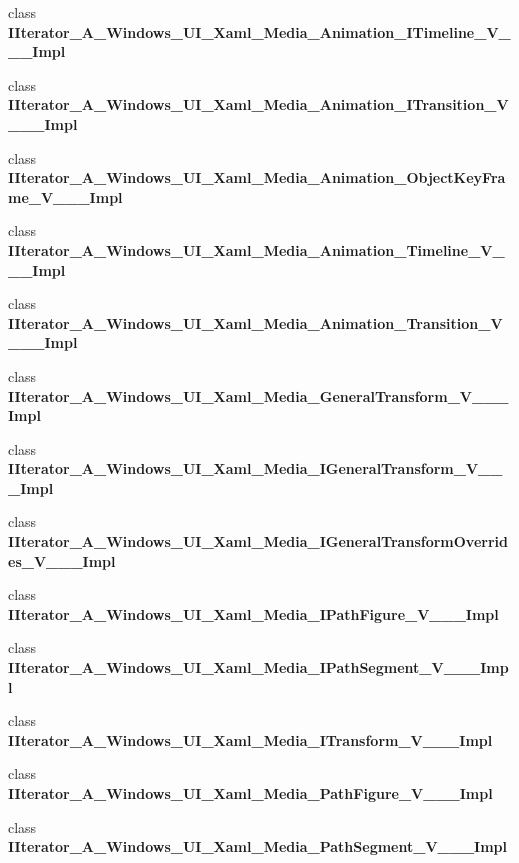 \begin{DoxyCompactItemize}
\item 
class {\bfseries I\+Iterator\+\_\+\+A\+\_\+\+Windows\+\_\+\+U\+I\+\_\+\+Xaml\+\_\+\+Media\+\_\+\+Animation\+\_\+\+I\+Timeline\+\_\+\+V\+\_\+\+\_\+\+\_\+\+Impl}
\item 
class {\bfseries I\+Iterator\+\_\+\+A\+\_\+\+Windows\+\_\+\+U\+I\+\_\+\+Xaml\+\_\+\+Media\+\_\+\+Animation\+\_\+\+I\+Transition\+\_\+\+V\+\_\+\+\_\+\+\_\+\+Impl}
\item 
class {\bfseries I\+Iterator\+\_\+\+A\+\_\+\+Windows\+\_\+\+U\+I\+\_\+\+Xaml\+\_\+\+Media\+\_\+\+Animation\+\_\+\+Object\+Key\+Frame\+\_\+\+V\+\_\+\+\_\+\+\_\+\+Impl}
\item 
class {\bfseries I\+Iterator\+\_\+\+A\+\_\+\+Windows\+\_\+\+U\+I\+\_\+\+Xaml\+\_\+\+Media\+\_\+\+Animation\+\_\+\+Timeline\+\_\+\+V\+\_\+\+\_\+\+\_\+\+Impl}
\item 
class {\bfseries I\+Iterator\+\_\+\+A\+\_\+\+Windows\+\_\+\+U\+I\+\_\+\+Xaml\+\_\+\+Media\+\_\+\+Animation\+\_\+\+Transition\+\_\+\+V\+\_\+\+\_\+\+\_\+\+Impl}
\item 
class {\bfseries I\+Iterator\+\_\+\+A\+\_\+\+Windows\+\_\+\+U\+I\+\_\+\+Xaml\+\_\+\+Media\+\_\+\+General\+Transform\+\_\+\+V\+\_\+\+\_\+\+\_\+\+Impl}
\item 
class {\bfseries I\+Iterator\+\_\+\+A\+\_\+\+Windows\+\_\+\+U\+I\+\_\+\+Xaml\+\_\+\+Media\+\_\+\+I\+General\+Transform\+\_\+\+V\+\_\+\+\_\+\+\_\+\+Impl}
\item 
class {\bfseries I\+Iterator\+\_\+\+A\+\_\+\+Windows\+\_\+\+U\+I\+\_\+\+Xaml\+\_\+\+Media\+\_\+\+I\+General\+Transform\+Overrides\+\_\+\+V\+\_\+\+\_\+\+\_\+\+Impl}
\item 
class {\bfseries I\+Iterator\+\_\+\+A\+\_\+\+Windows\+\_\+\+U\+I\+\_\+\+Xaml\+\_\+\+Media\+\_\+\+I\+Path\+Figure\+\_\+\+V\+\_\+\+\_\+\+\_\+\+Impl}
\item 
class {\bfseries I\+Iterator\+\_\+\+A\+\_\+\+Windows\+\_\+\+U\+I\+\_\+\+Xaml\+\_\+\+Media\+\_\+\+I\+Path\+Segment\+\_\+\+V\+\_\+\+\_\+\+\_\+\+Impl}
\item 
class {\bfseries I\+Iterator\+\_\+\+A\+\_\+\+Windows\+\_\+\+U\+I\+\_\+\+Xaml\+\_\+\+Media\+\_\+\+I\+Transform\+\_\+\+V\+\_\+\+\_\+\+\_\+\+Impl}
\item 
class {\bfseries I\+Iterator\+\_\+\+A\+\_\+\+Windows\+\_\+\+U\+I\+\_\+\+Xaml\+\_\+\+Media\+\_\+\+Path\+Figure\+\_\+\+V\+\_\+\+\_\+\+\_\+\+Impl}
\item 
class {\bfseries I\+Iterator\+\_\+\+A\+\_\+\+Windows\+\_\+\+U\+I\+\_\+\+Xaml\+\_\+\+Media\+\_\+\+Path\+Segment\+\_\+\+V\+\_\+\+\_\+\+\_\+\+Impl}

\end{DoxyCompactItemize}
